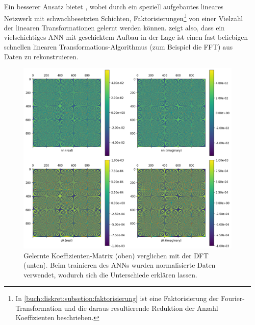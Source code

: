 Ein besserer Ansatz bietet \cite{ml:pmlr-v97-dao19a}, wobei durch ein speziell aufgebautes
lineares Netzwerk mit schwachbesetzten Schichten, Faktorisierungen\footnote{In
\ref{buch:diskret:subsetion:faktorisierung} ist eine Faktorisierung der
Fourier-Transformation und die daraus resultierende Reduktion der Anzahl Koeffizienten
beschrieben.} von einer Vielzahl der linearen Transformationen gelernt werden können.
\cite{ml:pmlr-v97-dao19a} zeigt also, dass ein vielschichtiges ANN mit geschicktem Aufbau in der Lage ist
einen fast beliebigen schnellen linearen Transformations-Algorithmus (zum Beispiel die FFT)
aus Daten zu rekonstruieren.

\begin{figure}
    \centering
    \includegraphics[width=\textwidth]{papers/ml/images/learned_coeff_vs_dft.png}
    \caption{Gelernte Koeffizienten-Matrix (oben) verglichen mit der DFT (unten).
    Beim trainieren des ANNs wurden normalisierte Daten verwendet, wodurch sich die
    Unterschiede erklären lassen.}
    \label{fig:ml:dft-with-ann:leanred-vs-dft}
\end{figure}
